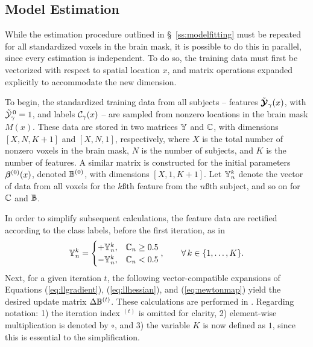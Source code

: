 \subsection{Model Estimation}\label{s:parallelfit}
While the estimation procedure outlined in \S\ \ref{ss:modelfitting} must be repeated for all standardized voxels in the brain mask, it is possible to do this in parallel, since every estimation is independent. To do so, the training data must first be vectorized with respect to spatial location $x$, and matrix operations expanded explicitly to accommodate the new dimension.
\par
To begin, the standardized training data from all subjects -- features $\tilde{\bm{\mathcal{Y}}}_{\gamma}(x)$, with $\tilde{\mathcal{Y}}_{\gamma}^{\thinspace0}=1$, and labels $\mathcal{C}_{\gamma}(x)$ -- are sampled from nonzero locations in the brain mask $M(x)$. These data are stored in two matrices $\mathbb{Y}$ and $\mathbb{C}$, with dimensions $[X,N,K+1]$ and $[X,N,1]$, respectively, where $X$ is the total number of nonzero voxels in the brain mask, $N$ is the number of subjects, and $K$ is the number of features. A similar matrix is constructed for the initial parameters $\bm{\beta}^{(0)}(x)$, denoted $\mathbb{B}^{(0)}$, with dimensions $[X,1,K+1]$. Let $\mathbb{Y}_n^k$ denote the vector of data from all voxels for the $k$\ss{th} feature from the $n$\ss{th} subject, and so on for $\mathbb{C}$ and $\mathbb{B}$.
\par
In order to simplify subsequent calculations, the feature data are rectified according to the class labels, before the first iteration, as in
\begin{equation}
\mathbb{Y}_n^k =
\begin{cases}
+\mathbb{Y}_n^k, & \mathbb{C}_n \ge 0.5\\
-\mathbb{Y}_n^k, & \mathbb{C}_n <  0.5\\
\end{cases},\qquad\forall\thinspace k \in \{1,\dots,K\}.
\end{equation}
Next, for a given iteration $t$, the following vector-compatible expansions of Equations (\ref{eq:llgradient}), (\ref{eq:llhessian}), and (\ref{eq:newtonmap}) yield the desired update matrix $\Delta\mathbb{B}^{(t)}$. These calculations are performed in .
Regarding notation:
1) the iteration index ${}^{(t)}$ is omitted for clarity,
2) element-wise multiplication is denoted by $\circ$, and
3) the variable $K$ is now defined as $1$, since this is essential to the simplification.
\par
